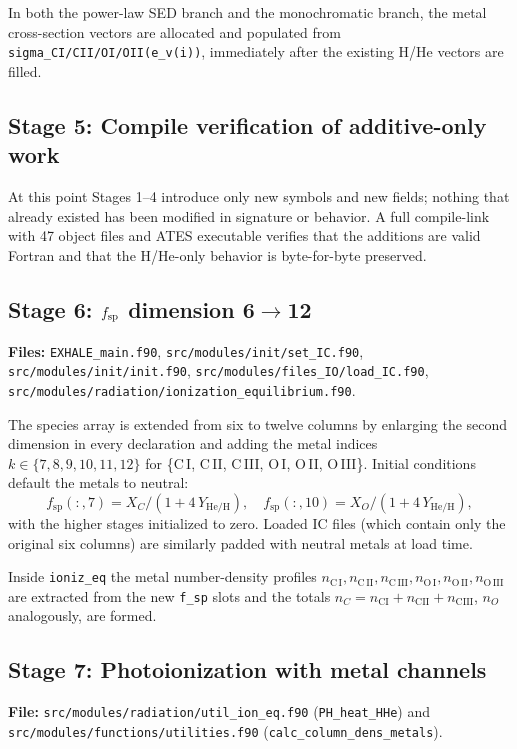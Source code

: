 \documentclass[english,a4paper]{my_memo}
\begin{document}
In both the power-law SED branch and the monochromatic branch, the
metal cross-section vectors are allocated and populated from
\texttt{sigma\_CI/CII/OI/OII(e\_v(i))}, immediately after the
existing H/He vectors are filled.

\subsection{Stage 5: Compile verification of additive-only work}
At this point Stages 1--4 introduce only new symbols and new fields;
nothing that already existed has been modified in signature or
behavior.  A full compile-link with 47 object files and ATES executable
verifies that the additions are valid Fortran and that the H/He-only
behavior is byte-for-byte preserved.

\subsection{Stage 6: $f_{\rm sp}$ dimension 6$\to$12}
\begin{sloppypar}
\textbf{Files:} \texttt{EXHALE\_main.f90},
\texttt{src/modules/init/set\_IC.f90},
\texttt{src/modules/init/init.f90},
\texttt{src/modules/files\_IO/load\_IC.f90},
\texttt{src/modules/radiation/ionization\_equilibrium.f90}.
\end{sloppypar}

The species array is extended from six to twelve columns by enlarging
the second dimension in every declaration and adding the metal indices
\(k \in \{7,8,9,10,11,12\}\) for
\{C\,I, C\,II, C\,III, O\,I, O\,II, O\,III\}.  Initial conditions
default the metals to neutral:
\[
  f_\mathrm{sp}(:, 7) = X_C / (1 + 4\,Y_{\!\mathrm{He/H}}), \quad
  f_\mathrm{sp}(:, 10) = X_O / (1 + 4\,Y_{\!\mathrm{He/H}}),
\]
with the higher stages initialized to zero.  Loaded IC files (which
contain only the original six columns) are similarly padded with
neutral metals at load time.

Inside \texttt{ioniz\_eq} the metal number-density profiles
\(n_{\mathrm{C\,I}}, n_{\mathrm{C\,II}}, n_{\mathrm{C\,III}},
n_{\mathrm{O\,I}}, n_{\mathrm{O\,II}}, n_{\mathrm{O\,III}}\) are
extracted from the new \texttt{f\_sp} slots and the totals
\(n_C = n_\mathrm{CI} + n_\mathrm{CII} + n_\mathrm{CIII}\),
\(n_O\) analogously, are formed.

\subsection{Stage 7: Photoionization with metal channels}
\textbf{File:} \texttt{src/modules/radiation/util\_ion\_eq.f90}
(\texttt{PH\_heat\_HHe}) and
\texttt{src/modules/functions/utilities.f90}
(\texttt{calc\_column\_dens\_metals}).
\end{document}
